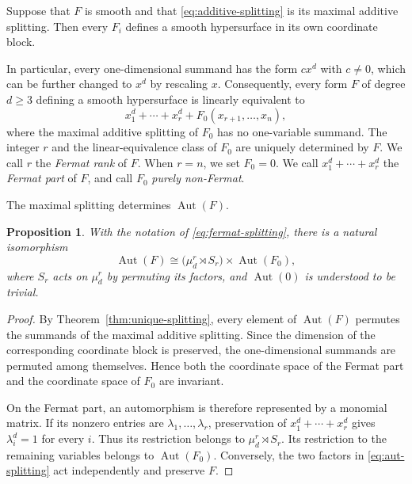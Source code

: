 \documentclass[12pt]{amsart}
\numberwithin{equation}{section}
\theoremstyle{plain}
\newtheorem{prop}[thm]{Proposition}
\theoremstyle{definition}
\theoremstyle{remark}
\DeclareMathOperator{\Aut}{Aut}
\begin{document}
Suppose that $F$ is smooth and that \eqref{eq:additive-splitting} is its
maximal additive splitting.  Then every $F_i$ defines a smooth hypersurface
in its own coordinate block.

In particular, every one-dimensional summand has the form $c x^d$ with
$c\neq0$,  which can be further changed to $x^d$ by
rescaling $x$.  Consequently, every form $F$ of degree $d\geq3$ defining a
smooth hypersurface is
linearly equivalent to
\begin{equation}\label{eq:fermat-splitting}
    x_1^d+\cdots+x_r^d+
    F_0(x_{r+1},\ldots,x_n),
\end{equation}
where the maximal additive splitting of $F_0$ has no one-variable summand.
The integer $r$ and the linear-equivalence class of $F_0$ are uniquely
determined by $F$.  We call $r$ the \emph{Fermat rank} of $F$.  When $r=n$,
we set $F_0=0$.  We call
$x_1^d+\cdots+x_r^d$ the \emph{Fermat part} of $F$, and call $F_0$
\emph{purely non-Fermat}.

The maximal splitting determines $\Aut(F)$.

\begin{prop}\label{prop:aut-splitting}
With the notation of \eqref{eq:fermat-splitting}, there is a natural
isomorphism
\begin{equation}\label{eq:aut-splitting}
    \Aut(F)
    \cong
    \bigl(\mu_d^r\rtimes S_r\bigr)\times\Aut(F_0),
\end{equation}
where $S_r$ acts on $\mu_d^r$ by permuting its factors, and
$\Aut(0)$ is understood to be trivial.
\end{prop}

\begin{proof}
By Theorem~\ref{thm:unique-splitting}, every element of $\Aut(F)$ permutes
the summands of the maximal additive splitting.  Since the dimension of the
corresponding coordinate block is preserved, the one-dimensional summands are
permuted among themselves. Hence both the coordinate space of the Fermat part
and the coordinate space of $F_0$ are invariant.

On the Fermat part, an automorphism is therefore represented by a monomial
matrix.  If its nonzero entries are $\lambda_1,\ldots,\lambda_r$, preservation
of $x_1^d+\cdots+x_r^d$ gives
$\lambda_i^d=1$ for every $i$. Thus its restriction belongs to
$\mu_d^r\rtimes S_r$.  Its restriction to the remaining variables belongs to
$\Aut(F_0)$. Conversely, the two factors in
\eqref{eq:aut-splitting} act independently and preserve $F$.
\end{proof}
\end{document}
